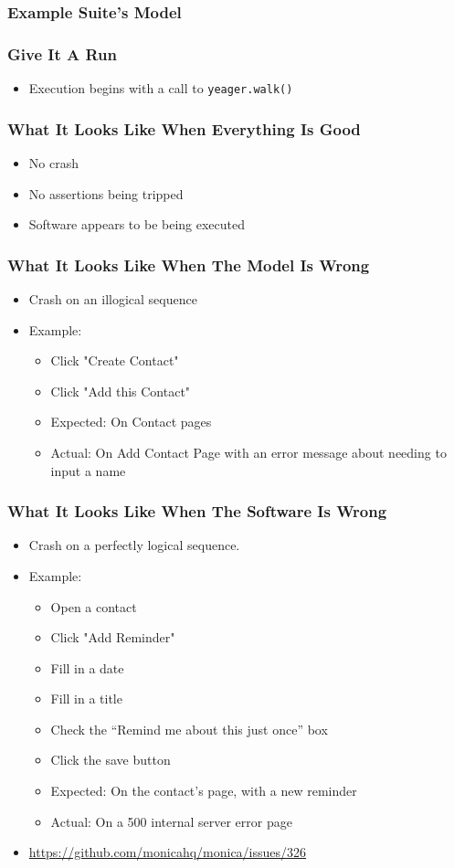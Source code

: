 \begin{frame}
  \frametitle{Example Suite's Model}
\end{frame}

\begin{frame}
  \frametitle{Give It A Run}
  \begin{itemize}
    \item Execution begins with a call to \texttt{yeager.walk()}
  \end{itemize}
\end{frame}

\begin{frame}
  \frametitle{What It Looks Like When Everything Is Good}
  \begin{itemize}
    \item No crash
    \item No assertions being tripped
    \item Software appears to be being executed
  \end{itemize}
\end{frame}

\begin{frame}
  \frametitle{What It Looks Like When The Model Is Wrong}
  \begin{itemize}
    \item Crash on an illogical sequence
    \item Example:
    \begin{itemize}
      \item Click "Create Contact"
      \item Click "Add this Contact"
      \item Expected: On Contact pages
      \item Actual: On Add Contact Page with an error message about needing to input a name
    \end{itemize}
  \end{itemize}
\end{frame}

\begin{frame}
  \frametitle{What It Looks Like When The Software Is Wrong}
  \begin{itemize}
    \item Crash on a perfectly logical sequence.
    \item Example:
    \begin{itemize}
      \item Open a contact
      \item Click "Add Reminder"
      \item Fill in a date
      \item Fill in a title
      \item Check the ``Remind me about this just once'' box
      \item Click the save button
      \item Expected: On the contact's page, with a new reminder
      \item Actual: On a 500 internal server error page
    \end{itemize}
    \item \url{https://github.com/monicahq/monica/issues/326}
  \end{itemize}
\end{frame}
